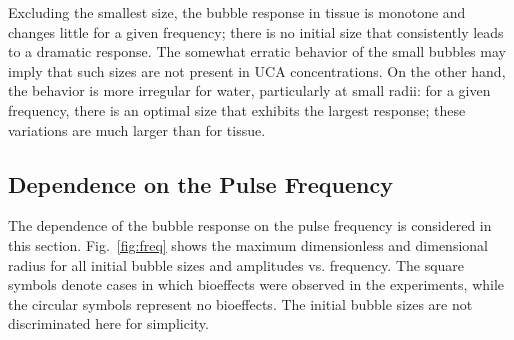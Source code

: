 Excluding the smallest size, the bubble response in tissue is monotone
and changes little for a given frequency; there is no initial size
that consistently leads to a dramatic response. The somewhat erratic
behavior of the small bubbles may imply that such sizes are not
present in UCA concentrations. On the other hand, the behavior is more
irregular for water, particularly at small radii: for a given
frequency, there is an optimal size that exhibits the largest
response; these variations are much larger than for tissue.  


 \subsection{Dependence on the Pulse Frequency}

The dependence of the bubble response on the pulse frequency is
considered in this section.  Fig.~\ref{fig:freq} shows the maximum
dimensionless and dimensional radius for all initial bubble sizes and
amplitudes vs. frequency. The square symbols denote cases in which
bioeffects were observed in the experiments, while the circular symbols
represent no bioeffects. The initial bubble sizes are not
discriminated here for simplicity.


